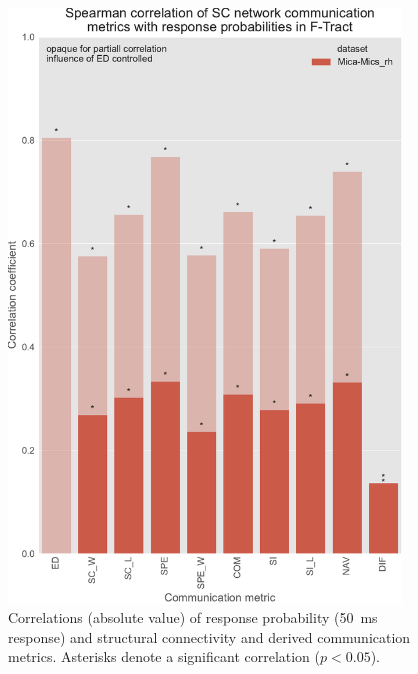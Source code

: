 \begin{figure}
    \centering
    \includegraphics[width=0.93\textwidth]{images/nootebook_generated/ftract_results/MNI-HCP-MMP1/5/ED0/0.25/short/mica_rhSpearman_correlation_of_SC_network_communication_metrics_with_response_probabilities_in_F-Tract.pdf}
    \caption[F-TRACT probability correlations - Mica-Mics\_rh 50 ms]{Correlations (absolute value) of response probability (50~ms response) and structural connectivity and derived communication metrics. Asterisks denote a significant correlation ($p<0.05$).}
    \label{fig:ftract_mica_short_probabilities}
\end{figure}

